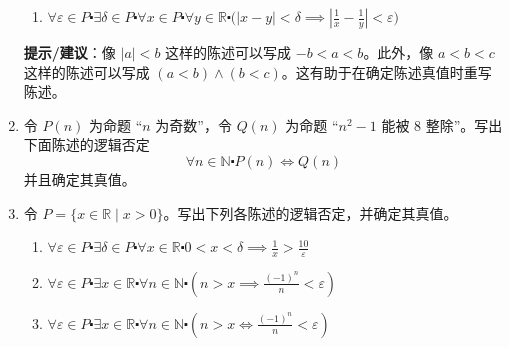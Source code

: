 \begin{enumerate}[label=(\arabic*)]
\begin{enumerate}[label=(\alph*)]
            \item $\forall \varepsilon \in P \centerdot \exists \delta \in P \centerdot \forall x \in P \centerdot \forall y \in \mathbb{R} \centerdot \Big(|x-y|<\delta \implies |\frac{1}{x} - \frac{1}{y}| < \varepsilon \Big)$
        \end{enumerate}
        \textbf{提示/建议}：像 $|a| < b$ 这样的陈述可以写成 $-b < a < b$。此外，像 $a < b < c$ 这样的陈述可以写成 $(a < b) \land (b < c)$。这有助于在确定陈述真值时重写陈述。
    \item 令 $P(n)$ 为命题 ``$n$ 为奇数''，令 $Q(n)$ 为命题 ``$n^2 - 1$ 能被 $8$ 整除''。写出下面陈述的逻辑否定
        \[\forall n \in \mathbb{N} \centerdot P(n) \iff Q(n)\]
        并且确定其真值。
    \item 令 $P = \{x \in \mathbb{R} \mid x > 0\}$。写出下列各陈述的逻辑否定，并确定其真值。
        \begin{enumerate}[label=(\alph*)]
            \item $\forall \varepsilon \in P \centerdot \exists \delta \in P \centerdot \forall x \in \mathbb{R} \centerdot 0 < x < \delta \implies \frac{1}{x} > \frac{10}{\varepsilon}$
            \item $\forall \varepsilon \in P \centerdot \exists x \in \mathbb{R} \centerdot \forall n \in \mathbb{N} \centerdot (n > x \implies \frac{(-1)^n}{n} < \varepsilon)$
            \item $\forall \varepsilon \in P \centerdot \exists x \in \mathbb{R} \centerdot \forall n \in \mathbb{N} \centerdot (n > x \iff\frac{(-1)^n}{n} < \varepsilon)$
        \end{enumerate}
\end{enumerate}